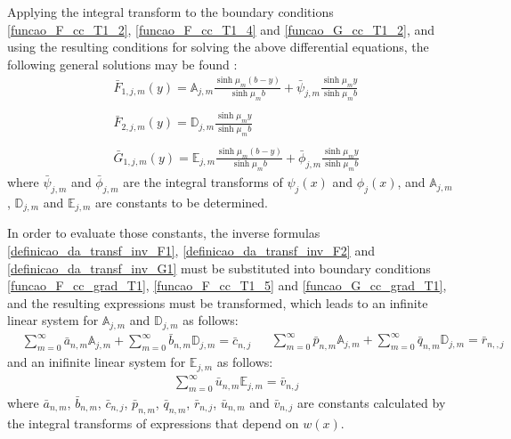 \documentclass[12pt]{CHT-20}
\begin{document}
Applying the integral transform to the boundary conditions \eqref{funcao_F_cc_T1_2}, \eqref{funcao_F_cc_T1_4} and \eqref{funcao_G_cc_T1_2}, and using the resulting conditions for solving the above differential equations, the following general solutions may be found \citep{livro_boyce}:
\begin{align}
& \bar{F}_{1,j,m}(y) = \mathbb{A}_{j,m} \frac{\sinh\mu_m (b - y)}{\sinh\mu_m b} +	\bar{\psi}_{j, m}\frac{\sinh\mu_m y}{\sinh\mu_m b} \label{solucao_temporaria_F1} \\ \nonumber \\
& \bar{F}_{2,j,m}(y) = \mathbb{D}_{j,m}\frac{\sinh\mu_m y}{\sinh\mu_m b} \label{solucao_temporaria_F2} \\ \nonumber \\
& \bar{G}_{1,j,m}(y) = \mathbb{E}_{j,m} \frac{\sinh\mu_m (b - y)}{\sinh\mu_m b} +\bar{\phi}_{j, m}\frac{\sinh\mu_m y}{\sinh\mu_m b} \label{solucao_temporaria_G1}
\end{align}
where $\bar{\psi}_{j, m}$ and $\bar{\phi}_{j, m}$ are the integral transforms of $\psi_j(x)$ and $\phi_j(x)$, and $\mathbb{A}_{j,m}$, $\mathbb{D}_{j,m}$ and $\mathbb{E}_{j,m}$ are constants to be determined.

In order to evaluate those constants, the inverse formulas \eqref{definicao_da_transf_inv_F1}, \eqref{definicao_da_transf_inv_F2} and \eqref{definicao_da_transf_inv_G1} must be substituted into boundary conditions \eqref{funcao_F_cc_grad_T1}, \eqref{funcao_F_cc_T1_5} and \eqref{funcao_G_cc_grad_T1}, and the resulting expressions must be transformed, which leads to an infinite linear system for $\mathbb{A}_{j,m}$ and $\mathbb{D}_{j,m}$ as follows:
\begin{subequations}
	\begin{align}
	& \sum_{m = 0}^\infty \bar{a}_{n,m} \mathbb{A}_{j,m} + \sum_{m = 0}^\infty \bar{b}_{n,m} \mathbb{D}_{j,m} = \bar{c}_{n,j} \label{sistema_para_coeficientes_1}
	\end{align}
	\begin{align}
	& \sum_{m = 0}^\infty \bar{p}_{n,m} \mathbb{A}_{j,m} + \sum_{m = 0}^\infty \bar{q}_{n,m} \mathbb{D}_{j,m} = \bar{r}_{n,,j} \label{sistema_para_coeficientes_2}
	\end{align}
\end{subequations}
and an inifinite linear system for $\mathbb{E}_{j,m}$ as follows:
\begin{align}
& \sum_{m = 0}^\infty \bar{u}_{n,m} \mathbb{E}_{j,m} = \bar{v}_{n,j} \label{sistema_para_coeficientes_3}
\end{align}
where $\bar{a}_{n,m}$, $\bar{b}_{n,m}$, $\bar{c}_{n,j}$, $\bar{p}_{n,m}$, $\bar{q}_{n,m}$, $\bar{r}_{n,j}$, $\bar{u}_{n,m}$ and $\bar{v}_{n,j}$ are constants calculated by the integral transforms of expressions that depend on $w(x)$.
\end{document}
